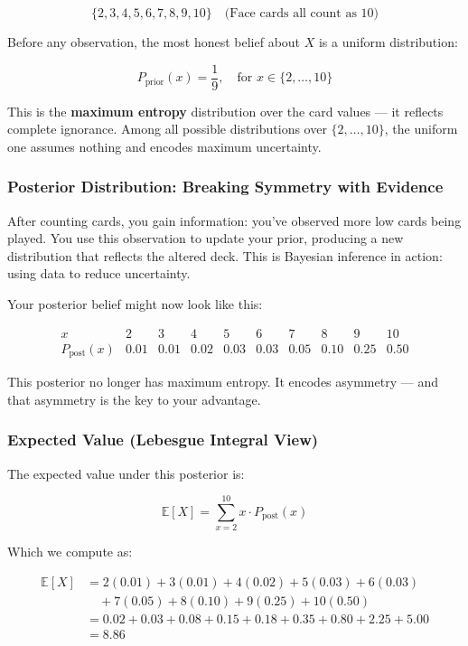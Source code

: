\[
\{2, 3, 4, 5, 6, 7, 8, 9, 10\}
\quad \text{(Face cards all count as 10)}
\]

Before any observation, the most honest belief about \( X \) is a uniform distribution:

\[
P_{\text{prior}}(x) = \frac{1}{9}, \quad \text{for } x \in \{2, \dots, 10\}
\]

This is the \textbf{maximum entropy} distribution over the card values — it reflects complete ignorance. Among all possible distributions over \(\{2,\dots,10\}\), the uniform one assumes nothing and encodes maximum uncertainty.

\subsubsection*{Posterior Distribution: Breaking Symmetry with Evidence}

After counting cards, you gain information: you've observed more low cards being played. You use this observation to update your prior, producing a new distribution that reflects the altered deck. This is Bayesian inference in action: using data to reduce uncertainty.

Your posterior belief might now look like this:

\[
\begin{array}{c|ccccccccc}
x & 2 & 3 & 4 & 5 & 6 & 7 & 8 & 9 & 10 \\
\hline
P_{\text{post}}(x) & 0.01 & 0.01 & 0.02 & 0.03 & 0.03 & 0.05 & 0.10 & 0.25 & 0.50
\end{array}
\]

This posterior no longer has maximum entropy. It encodes asymmetry — and that asymmetry is the key to your advantage.

\subsubsection*{Expected Value (Lebesgue Integral View)}

The expected value under this posterior is:

\[
\mathbb{E}[X] = \sum_{x=2}^{10} x \cdot P_{\text{post}}(x)
\]

Which we compute as:

\[
\begin{aligned}
\mathbb{E}[X] &= 2(0.01) + 3(0.01) + 4(0.02) + 5(0.03) + 6(0.03) \\
              &\quad + 7(0.05) + 8(0.10) + 9(0.25) + 10(0.50) \\
              &= 0.02 + 0.03 + 0.08 + 0.15 + 0.18 + 0.35 + 0.80 + 2.25 + 5.00 \\
              &= \boxed{8.86}
\end{aligned}
\]

